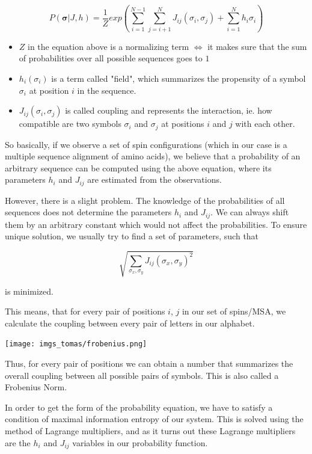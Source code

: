 \documentclass[11pt]{article}
\begin{document}
\begin{itemize}
    $$P(\bm{\sigma} | J, h) = \frac{1}{Z} exp\left(\sum_{i = 1}^{N-1} \sum_{j=i+1}^N J_{ij}(\sigma_i, \sigma_j) + \sum_{i=1}^N h_i{\sigma_i}\right)$$
    
    \begin{itemize}
        \item $Z$ in the equation above is a normalizing term $\iff$ it makes sure that the sum of probabilities over all possible sequences goes to $1$
        \item $h_i(\sigma_i)$ is a term called "field", which summarizes the propensity of a symbol $\sigma_i$ at position $i$ in the sequence.
        \item $J_{ij}(\sigma_i, \sigma_j)$ is called coupling and represents the interaction, ie. how compatible are two symbols $\sigma_i$ and $\sigma_j$ at positions $i$ and $j$ with each other.
    \end{itemize}
    
    So basically, if we observe a set of spin configurations (which in our case is a multiple sequence alignment of amino acids), we believe that a probability of an arbitrary sequence can be computed using the above equation, where its parameters $h_i$ and $J_{ij}$ are estimated from the observations.
    
    However, there is a slight problem. The knowledge of the probabilities of all sequences does not determine the parameters $h_i$ and $J_{ij}$. We can always shift them by an arbitrary constant which would not affect the probabilities. To ensure unique solution, we usually try to find a set of parameters, such that
    
    $$\sqrt{\sum_{\sigma_x, \sigma_y} J_{ij}(\sigma_x, \sigma_y)^2}$$
    
    is minimized. 
    
    This means, that for every pair of positions $i$, $j$ in our set of spins/MSA, we calculate the coupling between every pair of letters in our alphabet. 
    
    \begin{center}
        \texttt{[image: imgs\_tomas/frobenius.png]}
    \end{center}
    
    Thus, for every pair of positions we can obtain a number that summarizes the overall coupling between all possible pairs of symbols. This is also called a Frobenius Norm.
    
    In order to get the form of the probability equation, we have to satisfy a condition of maximal information entropy of our system. This is solved using the method of Lagrange multipliers, and as it turns out these Lagrange multipliers are the $h_i$ and $J_{ij}$ variables in our probability function.
    

\end{itemize}
\end{document}
